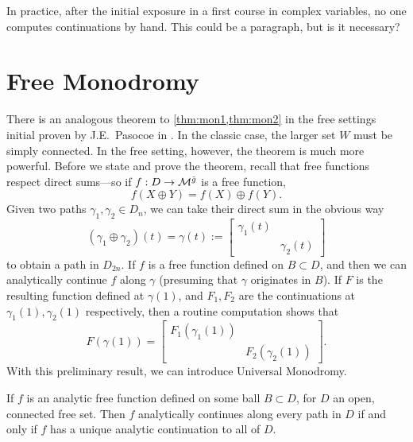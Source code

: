 In practice, after the initial exposure in a first course in complex variables,
no one computes continuations by hand. {\color{red} This could be a paragraph,
  but is it necessary?}

\section{Free Monodromy}%
\label{sec:freemono}

There is an analogous theorem to \cref{thm:mon1,thm:mon2} in the free settings
initial proven by J.E.\ Pasocoe in \cite{pascoeNoncommutative2020}.
In the classic case, the larger set \(W\) must be simply connected. In the free
setting, however, the theorem is much more powerful. Before we state and prove
the theorem, recall that free functions respect direct sums---so if
\(f: D\to \mathcal{M}^{\tilde{g}} \) is a free function,
\[
  f(X \oplus Y ) = f(X) \oplus f(Y).
\]
Given two paths \(\gamma_1, \gamma_2 \in D_n\), we can take their direct sum in
the obvious way
\[
  (\gamma_1\oplus\gamma_2 )(t) = \gamma(t) := \begin{bmatrix} \gamma_1(t) & \\& \gamma_2(t) \end{bmatrix}
\]
to obtain a path in \(D_{2n}\). If \(f\) is a free function defined on
\(B \subset D\), and then we can analytically continue \(f\) along \(\gamma\)
(presuming that \(\gamma\) originates in \(B\)). If \(F\) is the resulting
function defined at \(\gamma(1)\), and \(F_1,F_2\) are the continuations at
\(\gamma_1(1), \gamma_2(1)\) respectively, then a routine computation shows that
\[
  F(\gamma(1)) = \begin{bmatrix} F_1(\gamma_1(1)) & \\& F_2(\gamma_2(1))\end{bmatrix} .
\]
With this preliminary result, we can introduce Universal Monodromy.
\begin{theorem}%
  \label{thm:freemono}
  If \(f\) is an analytic free function defined on some ball \(B \subset D\),
  for \(D\) an open, connected free set.
  Then \(f\) analytically continues along every path in \(D\) if and only if
  \(f\) has a unique analytic continuation to all of \(D\).
\end{theorem}

